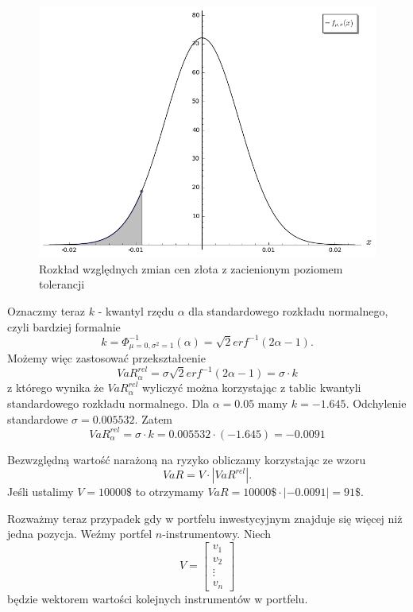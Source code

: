 \documentclass[11pt,titlepage]{article}
\numberwithin{equation}{section}
\begin{document}
\begin{figure}[H]
\begin{center}
\includegraphics[scale=0.5]{chart1.png}
\end{center}
\caption{Rozkład względnych zmian cen złota z zacienionym poziomem tolerancji} \label{czynnosci_GD}
\end{figure} 


Oznaczmy teraz $k$ - kwantyl rzędu $\alpha$ dla standardowego rozkładu normalnego, czyli bardziej formalnie 
$$k=\Phi_{\mu=0,\sigma^{2}=1}^{-1}(\alpha)=\sqrt{2} erf^{-1}(2\alpha-1).$$
Możemy więc zastosować przekształcenie
$$VaR_{\alpha}^{rel}   =\sigma \sqrt{2} erf^{-1}(2\alpha-1)=\sigma \cdot k$$
z którego wynika że $VaR_{\alpha}^{rel}$ wyliczyć można korzystając z tablic kwantyli standardowego rozkładu normalnego. Dla $\alpha=0.05$ mamy $k=-1.645$. Odchylenie standardowe $\sigma=0.005532$. Zatem
$$VaR_{\alpha}^{rel}=\sigma \cdot k= 0.005532 \cdot (-1.645)=-0.0091$$

Bezwzględną wartość narażoną na ryzyko obliczamy korzystając ze wzoru
$$VaR = V \cdot |VaR^{rel}|.$$
Jeśli ustalimy $V=10000\$$ to otrzymamy $VaR = 10000\$ \cdot |-0.0091| = 91\$ $.

Rozważmy teraz przypadek gdy w portfelu inwestycyjnym znajduje się więcej niż jedna pozycja. Weźmy portfel $n$-instrumentowy. Niech
$$V=\begin{bmatrix}
 v_1 \\ 
 v_2 \\
\vdots \\
v_n
\end{bmatrix}$$
będzie wektorem wartości kolejnych instrumentów w portfelu.
\end{document}
